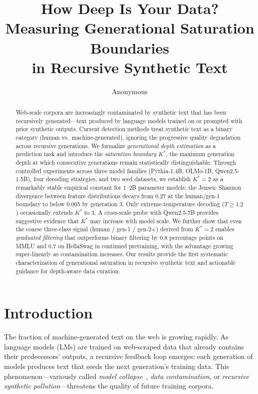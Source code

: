 \documentclass[11pt,a4paper]{article}
\title{How Deep Is Your Data? Measuring Generational Saturation Boundaries\\in Recursive Synthetic Text}
\author{Anonymous}
\begin{document}
\maketitle

\begin{abstract}
Web-scale corpora are increasingly contaminated by synthetic text that has been recursively generated---text produced by language models trained on or prompted with prior synthetic outputs. Current detection methods treat synthetic text as a binary category (human vs.\ machine-generated), ignoring the progressive quality degradation across recursive generations. We formalize \emph{generational depth estimation} as a prediction task and introduce the \emph{saturation boundary} $K^*$, the maximum generation depth at which consecutive generations remain statistically distinguishable. Through controlled experiments across three model families (Pythia-1.4B, OLMo-1B, Qwen2.5-1.5B), four decoding strategies, and two seed datasets, we establish $K^*=2$ as a remarkably stable empirical constant for 1--2B parameter models: the Jensen--Shannon divergence between feature distributions decays from 0.27 at the human/gen-1 boundary to below 0.005 by generation 3. Only extreme-temperature decoding ($T\geq 1.2$) occasionally extends $K^*$ to 3. A cross-scale probe with Qwen2.5-7B provides suggestive evidence that $K^*$ may increase with model scale. We further show that even the coarse three-class signal (human / gen-1 / gen-2+) derived from $K^*=2$ enables \emph{graduated filtering} that outperforms binary filtering by 0.8 percentage points on MMLU and 0.7 on HellaSwag in continued pretraining, with the advantage growing super-linearly as contamination increases. Our results provide the first systematic characterization of generational saturation in recursive synthetic text and actionable guidance for depth-aware data curation.
\end{abstract}

\section{Introduction}

The fraction of machine-generated text on the web is growing rapidly. As language models (LMs) are trained on web-scraped data that already contains their predecessors' outputs, a recursive feedback loop emerges: each generation of models produces text that seeds the next generation's training data. This phenomenon---variously called \emph{model collapse}~\cite{shumailov2024ai}, \emph{data contamination}, or \emph{recursive synthetic pollution}---threatens the quality of future training corpora.
\end{document}
